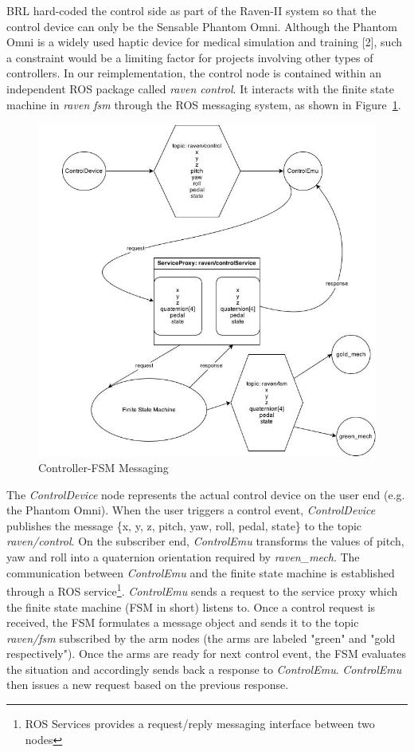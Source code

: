 \documentclass[letterpaper,twocolumn,10pt]{article}
\begin{document}
BRL hard-coded the control side as part of the Raven-II system so that
the control device can only be the Sensable Phantom Omni. Although the
Phantom Omni is a widely used haptic device for medical simulation and
training [2], such a constraint would be a limiting factor for projects
involving other types of controllers. In our reimplementation, the
control node is contained within an independent ROS package called
\emph{raven control}. It interacts with the finite state machine in
\emph{raven fsm} through the ROS messaging system, as shown in
Figure~\ref{fig:control_diagram}.

\begin{figure}[h]
  \includegraphics[scale=0.33]{ControlDiagram.jpg}
  \caption{Controller-FSM Messaging}
  \label{fig:control_diagram}
\end{figure}

The \emph{ControlDevice} node represents the actual control device on
the user end (e.g. the Phantom Omni). When the user triggers a control
event, \emph{ControlDevice} publishes the message \{x, y, z, pitch,
yaw, roll, pedal, state\} to the topic \emph{raven/control}. On the
subscriber end, \emph{ControlEmu} transforms the values of pitch, yaw
and roll into a quaternion orientation required by
\emph{raven\_mech}. The communication between \emph{ControlEmu} and
the finite state machine is established through a ROS
service\footnote{ROS Services provides a request/reply messaging
  interface between two nodes}. \emph{ControlEmu} sends a request to
the service proxy which the finite state machine (FSM in short)
listens to. Once a control request is received, the FSM formulates a
message object and sends it to the topic \emph{raven/fsm} subscribed
by the arm nodes (the arms are labeled "green" and "gold
respectively"). Once the arms are ready for next control event, the
FSM evaluates the situation and accordingly sends back a response to
\emph{ControlEmu}. \emph{ControlEmu} then issues a new request based
on the previous response.
\end{document}
